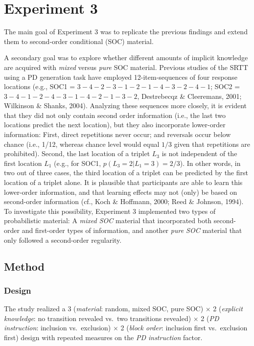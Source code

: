 \documentclass[man]{apa6}
\theoremstyle{definition}
\theoremstyle{definition}
\theoremstyle{definition}
\theoremstyle{remark}
\begin{document}
\section{Experiment 3}\label{experiment-3}

The main goal of Experiment 3 was to replicate the previous findings and
extend them to second-order conditional (SOC) material.

A secondary goal was to explore whether different amounts of implicit
knowledge are acquired with \emph{mixed} versus \emph{pure} SOC
material. Previous studies of the SRTT using a PD generation task have
employed 12-item-sequences of four response locations (e.g., SOC1 =
\(3{-}4{-}2{-}3{-}1{-}2{-}1{-}4{-}3{-}2{-}4{-}1\); SOC2 =
\(3{-}4{-}1{-}2{-}4{-}3{-}1{-}4{-}2{-}1{-}3{-}2\), Destrebecqz \&
Cleeremans, 2001; Wilkinson \& Shanks, 2004). Analyzing these sequences
more closely, it is evident that they did not only contain second order
information (i.e., the last two locations predict the next location),
but they also incorporate lower-order information: First, direct
repetitions never occur; and reversals occur below chance (i.e., 1/12,
whereas chance level would equal \(1/3\) given that repetitions are
prohibited). Second, the last location of a triplet \(L_3\) is not
independent of the first location \(L_1\) (e.g., for SOC1,
\(p(L_3 = 2 | L_1 = 3) = 2/3\)). In other words, in two out of three
cases, the third location of a triplet can be predicted by the first
location of a triplet alone. It is plausible that participants are able
to learn this lower-order information, and that learning effects may not
(only) be based on second-order information (cf., Koch \& Hoffmann,
2000; Reed \& Johnson, 1994). To investigate this possibility,
Experiment 3 implemented two types of probabilistic material: A
\emph{mixed SOC} material that incorporated both second-order and
first-order types of information, and another \emph{pure SOC} material
that only followed a second-order regularity.

\subsection{Method}\label{method-2}

\subsubsection{Design}\label{design-2}

The study realized a 3 (\emph{material}: random, mixed SOC, pure SOC)
\(\times\) 2 (\emph{explicit knowledge}: no transition revealed vs.~two
transitions revealed) \(\times\) 2 (\emph{PD instruction}: inclusion
vs.~exclusion) \(\times\) 2 (\emph{block order}: inclusion first
vs.~exclusion first) design with repeated measures on the \emph{PD
instruction} factor.
\end{document}
